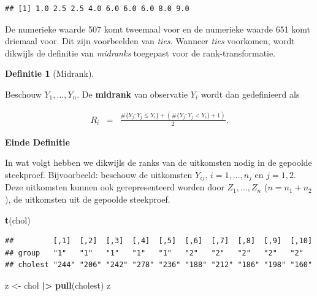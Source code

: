 \documentclass[
  12pt,dutch]{book}
\newenvironment{Shaded}{\begin{snugshade}}{\end{snugshade}}
\newcommand{\FunctionTok}[1]{\textcolor[rgb]{0.13,0.29,0.53}{\textbf{#1}}}
\newcommand{\NormalTok}[1]{#1}
\newcommand{\OtherTok}[1]{\textcolor[rgb]{0.56,0.35,0.01}{#1}}
\newcommand{\SpecialCharTok}[1]{\textcolor[rgb]{0.81,0.36,0.00}{\textbf{#1}}}
\theoremstyle{definition}
\newtheorem{definition}{Definitie}[chapter]
\theoremstyle{definition}
\theoremstyle{definition}
\theoremstyle{definition}
\theoremstyle{remark}
\begin{document}
\begin{verbatim}
## [1] 1.0 2.5 2.5 4.0 6.0 6.0 6.0 8.0 9.0
\end{verbatim}

De numerieke waarde 507 komt tweemaal voor en de numerieke waarde 651 komt driemaal voor. Dit zijn voorbeelden van \emph{ties}.
Wanneer \emph{ties} voorkomen, wordt dikwijls de definitie van \emph{midranks} toegepast voor de rank-transformatie.

\begin{definition}[Midrank]
\protect\hypertarget{def:unnamed-chunk-210}{}\label{def:unnamed-chunk-210}~
\end{definition}

Beschouw \(Y_1, \ldots, Y_n\).
De \textbf{midrank} van observatie \(Y_i\) wordt dan
gedefinieerd als

\begin{eqnarray*}
  R_i &=& \frac{ \#\{Y_j: Y_j\leq Y_i\} + ( \#\{Y_j: Y_j < Y_i\} +1)}{2}.
\end{eqnarray*}

\textbf{Einde Definitie}

In wat volgt hebben we dikwijls de ranks van de uitkomsten nodig in de gepoolde steekproef. Bijvoorbeeld: beschouw de uitkomsten \(Y_{ij}\), \(i=1,\ldots, n_j\) en \(j=1,2\).
Deze uitkomsten kunnen ook gerepresenteerd worden door \(Z_1,\ldots, Z_n\) (\(n=n_1+n_2\)), de uitkomsten uit de gepoolde steekproef.

\begin{Shaded}
\begin{Highlighting}[]
\FunctionTok{t}\NormalTok{(chol)}
\end{Highlighting}
\end{Shaded}

\begin{verbatim}
##         [,1]  [,2]  [,3]  [,4]  [,5]  [,6]  [,7]  [,8]  [,9]  [,10]
## group   "1"   "1"   "1"   "1"   "1"   "2"   "2"   "2"   "2"   "2"  
## cholest "244" "206" "242" "278" "236" "188" "212" "186" "198" "160"
\end{verbatim}

\begin{Shaded}
\begin{Highlighting}[]
\NormalTok{z }\OtherTok{\textless{}{-}}\NormalTok{ chol }\SpecialCharTok{|\textgreater{}}
    \FunctionTok{pull}\NormalTok{(cholest)}
\NormalTok{z}
\end{Highlighting}
\end{Shaded}
\end{document}
